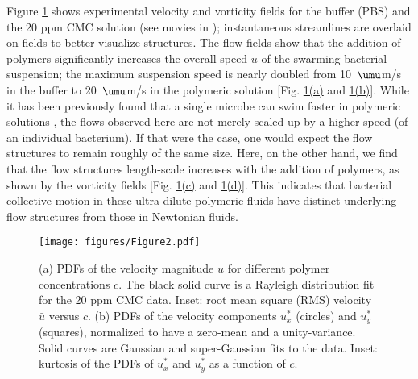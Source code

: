 \documentclass[aps,prl,floatfix,footinbib,twocolumn,superscriptaddress]{revtex4-1}
\begin{document}
Figure \hyperref[fig1]{1} shows experimental velocity and vorticity fields for the buffer (PBS) and the 20 ppm CMC solution (see movies in \cite{Supp_Mat}); instantaneous streamlines are overlaid on fields to better visualize structures. The flow fields show that the addition of polymers significantly increases the overall speed $u$ of the swarming bacterial suspension; the maximum suspension speed is nearly doubled from 10~$\umu$m/s in the buffer to 20~$\umu$m/s in the polymeric solution [Fig. \hyperref[fig1]{1(a)} and \hyperref[fig1]{1(b)}]. While it has been previously found that a single microbe can swim faster in polymeric solutions \cite{Teran_PRL_2010,Morozov_Poon_PNAS_2014, Yeomans_NatPhys_2019, Patteson2015}, the flows observed here are not merely scaled up by a higher speed (of an individual bacterium). If that were the case, one would expect the flow structures to remain roughly of the same size. Here, on the other hand, we find that the flow structures length-scale increases with the addition of polymers, as shown by the vorticity fields [Fig. \hyperref[fig1]{1(c)} and \hyperref[fig1]{1(d)}]. This indicates that bacterial collective motion in these ultra-dilute polymeric fluids have distinct underlying flow structures from those in Newtonian fluids.

\begin{figure}[t!]\label{fig2}
\centering
\texttt{[image: figures/Figure2.pdf]}
\caption{(a) PDFs of the velocity magnitude $u$ for different polymer concentrations $c$. The black solid curve is a Rayleigh distribution fit for the 20 ppm CMC data. Inset: root mean square (RMS) velocity $\bar{u}$ versus $c$. (b) PDFs of the velocity components $u_x^*$ (circles) and $u_y^*$ (squares), normalized to have a zero-mean and a unity-variance. Solid curves are Gaussian and super-Gaussian fits to the data. Inset: kurtosis of the PDFs of $u_x^*$ and $u_y^*$ as a function of $c$.}
\end{figure}
\end{document}
